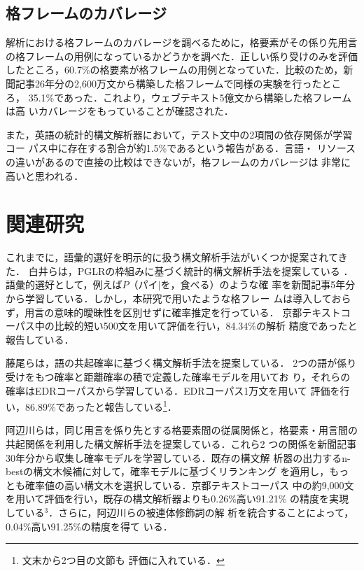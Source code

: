 \documentclass[japanese]{jnlp_1.3e}
\begin{document}
\begin{table}[b]

\end{table}


\subsection{格フレームのカバレージ}

解析における格フレームのカバレージを調べるために，格要素がその係り先用言
の格フレームの用例になっているかどうかを調べた．正しい係り受けのみを評価
したところ，60.7\%の格要素が格フレームの用例となっていた．比較のため，新
聞記事26年分の2,600万文から構築した格フレームで同様の実験を行ったところ，
35.1\%であった．これより，ウェブテキスト5億文から構築した格フレームは高
いカバレージをもっていることが確認された．

また，英語の統計的構文解析器において，テスト文中の2項間の依存関係が学習コー
パス中に存在する割合が約1.5\%であるという報告がある\cite{Bikel2004}．言語・
リソースの違いがあるので直接の比較はできないが，格フレームのカバレージは
非常に高いと思われる．


\section{関連研究}

これまでに，語彙的選好を明示的に扱う構文解析手法がいくつか提案されてきた．
白井らは，PGLRの枠組みに基づく統計的構文解析手法を提案している
\cite{Shirai1998}．語彙的選好として，例えば$P（パイ|を，食べる）$のような確
率を新聞記事5年分から学習している．しかし，本研究で用いたような格フレー
ムは導入しておらず，用言の意味的曖昧性を区別せずに確率推定を行っている．
京都テキストコーパス中の比較的短い500文を用いて評価を行い，84.34\%の解析
精度であったと報告している．

藤尾らは，語の共起確率に基づく構文解析手法を提案している\cite{Fujio1999}．
2つの語が係り受けをもつ確率と距離確率の積で定義した確率モデルを用いてお
り，それらの確率はEDRコーパスから学習している．EDRコーパス1万文を用いて
評価を行い，86.89\%であったと報告している\footnote{文末から2つ目の文節も
評価に入れている．}．

阿辺川らは，同じ用言を係り先とする格要素間の従属関係と，格要素・用言間の
共起関係を利用した構文解析手法を提案している\cite{Abekawa2006}．これら2
つの関係を新聞記事30年分から収集し確率モデルを学習している．既存の構文解
析器の出力するn-bestの構文木候補に対して，確率モデルに基づくリランキング
を適用し，もっとも確率値の高い構文木を選択している．京都テキストコーパス
中の約9,000文を用いて評価を行い，既存の構文解析器よりも0.26\%高い91.21\%
    の精度を実現している\kern0pt$^{3}$．さらに，阿辺川らの被連体修飾詞の解
析\cite{Abekawa2005}を統合することによって，0.04\%高い91.25\%の精度を得て
いる．
\end{document}
